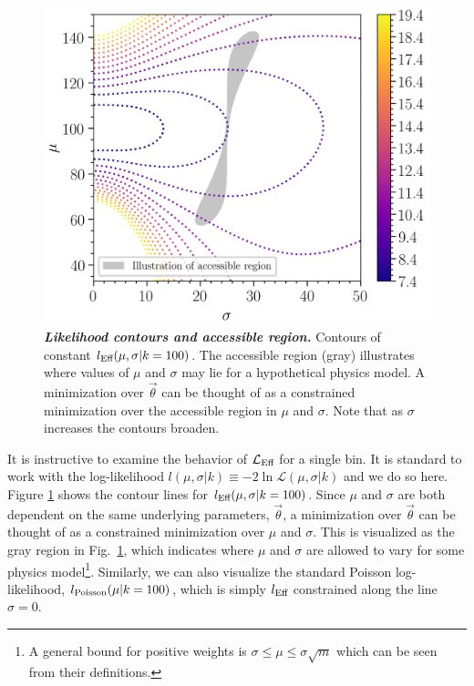 \documentclass[a4paper, 11pt]{article}
\newcommand{\like}{\mathcal{L}}
\newcommand{\vectheta}{\vec{\theta}}
\newcommand{\mcl}{\like_\textmd{Eff}}
\newcommand{\lpoisson}{l_{\textmd{Poisson}}}
\newcommand{\lmc}{l_\textmd{Eff}}
\begin{document}
\begin{figure}[htp]
\centering
\includegraphics[width=0.5856\linewidth]{fig/fig1_contour}
\caption{\textbf{\textit{Likelihood contours and accessible region.}} Contours of constant $\lmc(\mu,\sigma|k=100)$. The accessible region (gray) illustrates where values of $\mu$ and $\sigma$ may lie for a hypothetical physics model. A minimization over $\vectheta$ can be thought of as a constrained minimization over the accessible region in $\mu$ and $\sigma$. Note that as $\sigma$ increases the contours broaden.}
\label{fig:contour}
\end{figure}

It is instructive to examine the behavior of $\mcl$ for a single bin. It is standard to work with the log-likelihood $l(\mu,\sigma|k) \equiv -2\ln \like(\mu, \sigma|k)$ and we do so here. Figure \ref{fig:contour} shows the contour lines for $\lmc(\mu,\sigma|k=100)$. Since $\mu$ and $\sigma$ are both dependent on the same underlying parameters, $\vectheta$, a minimization over $\vectheta$ can be thought of as a constrained minimization over $\mu$ and $\sigma$. This is visualized as the gray region in Fig.~\ref{fig:contour}, which indicates where $\mu$ and $\sigma$ are allowed to vary for some physics model\footnote{A general bound for positive weights is $\sigma \leq \mu \leq \sigma \sqrt{m}$ which can be seen from their definitions.}. Similarly, we can also visualize the standard Poisson log-likelihood, $\lpoisson(\mu|k=100)$, which is simply $\lmc$ constrained along the line $\sigma=0$. %
\end{document}
